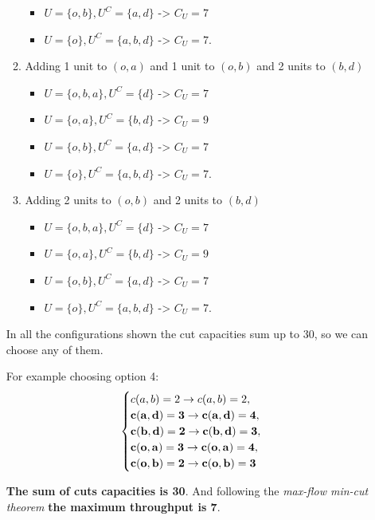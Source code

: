 \documentclass[
	12pt, %
]{fphw}
\begin{document}
\begin{enumerate}[{\bfseries (a)}]
\begin{enumerate}[1)]
\begin{itemize}
                \item $U=\{o,b\},U^C=\{a,d\}$ -> $C_U = 7$
                \item $U=\{o\},U^C=\{a,b,d\}$ -> $C_U = 7$.
            \end{itemize}
            \item Adding 1 unit to $(o,a)$ and 1 unit to $(o,b)$ and 2 units to $(b,d)$
            \begin{itemize}
                \item $U=\{o,b,a\},U^C=\{d\}$ -> $C_U = 7$
                \item $U=\{o,a\},U^C=\{b,d\}$ -> $C_U = 9$
                \item $U=\{o,b\},U^C=\{a,d\}$ -> $C_U = 7$
                \item $U=\{o\},U^C=\{a,b,d\}$ -> $C_U = 7$.
            \end{itemize}
            \item Adding 2 units to $(o,b)$ and 2 units to $(b,d)$
            \begin{itemize}
                \item $U=\{o,b,a\},U^C=\{d\}$ -> $C_U = 7$
                \item $U=\{o,a\},U^C=\{b,d\}$ -> $C_U = 9$
                \item $U=\{o,b\},U^C=\{a,d\}$ -> $C_U = 7$
                \item $U=\{o\},U^C=\{a,b,d\}$ -> $C_U = 7$.
            \end{itemize}
        \end{enumerate}
        In all the configurations shown the cut capacities sum up to 30, so we can choose any of them. 
            
            For example choosing option 4: 
            $$
            \begin{cases}
                c(a,b) = 2 \rightarrow c(a,b) = 2,\\
                \bf{c(a,d) = 3 \rightarrow c(a,d) = 4},\\
                \bf{c(b,d) = 2 \rightarrow c(b,d) = 3},\\
                \bf{c(o,a) = 3 \rightarrow c(o,a) = 4},\\
                \bf{c(o,b) = 2 \rightarrow c(o,b) = 3}
            \end{cases}
            $$
            
            \textbf{The sum of cuts capacities is 30}.
            And following the \emph{max-flow min-cut theorem} \textbf{the maximum throughput is 7}.
\end{enumerate}
\end{document}
